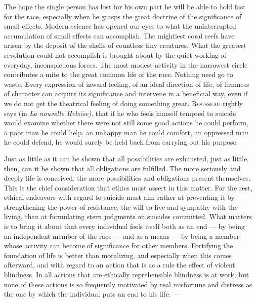 \documentclass[12pt,a4paper,openany]{book}
\newcommand{\opage}[1]{\marginnote{\footnotesize\textit{[#1]}}}
\begin{document}
The hope the single person has lost for his own part he will be able to hold fast for the race, especially when he
grasps the great doctrine of the significance of small effects. Modern science has opened our eyes to what the
uninterrupted accumulation of small effects can accomplish. The mightiest coral reefs have arisen by the deposit
of the shells of countless tiny creatures. What the greatest revolution could not accomplish is brought about by the
quiet working of everyday, inconspicuous forces. The most modest activity in the narrowest circle contributes a
mite to the great common life of the race. Nothing need go to waste. Every expression of inward feeling, of an
ideal direction of life, of firmness of character can acquire its significance and intervene in a beneficial way,
even if we do not get the theatrical feeling of doing something great. \textsc{Rousseau} rightly says (in \textit{La
nouvelle Heloïse),} that if he who feels himself tempted to suicide would examine whether there were not still
some good actions he could perform, a poor man he could help, an unhappy man he could comfort, an oppressed man he
could defend, he would surely be held back from carrying out his purpose.

Just as little as it can be shown that all possibilities are exhausted, just as little, then, can it be shown that
all obligations are fulfilled. The more seriously and deeply life is conceived, the more possibilities and
obligations present themselves. This is the chief consideration that ethics must assert in this matter. For the
rest, ethical endeavors with regard to suicide must aim rather at preventing it by strengthening the power of
resistance, the will to live and sympathy with the living, than at formulating stern judgments on suicides
committed. What matters is to bring it about that every individual feels itself both as an end --- by being an
independent member of the race --- and as a means --- by being a member whose activity can become of significance
for other members. Fortifying the foundation of life is better than moralizing, and especially when this comes
afterward, and with regard to an action that is as a rule
\opage{218}the effect of violent blindness. In all actions that are ethically reprehensible blindness is at work; but
none of these actions is so frequently motivated by real misfortune and distress as the one by which the
individual puts an end to his life. ---
\end{document}
